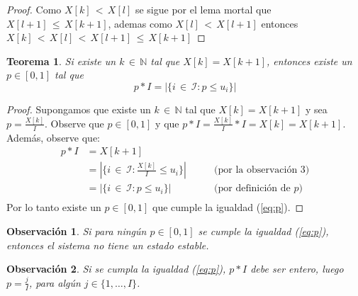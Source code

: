 \documentclass{article}
\newtheorem{teor}{Teorema}
\newtheorem{obs}{Observación}
\begin{document}
\begin{proof}
Como $X[k]\,{<}\,X[l]$ se sigue por el lema mortal que $X[l{+}1]\,{\leq}\,X[k{+}1]$, ademas como $X[l]\,{<}\,X[l{+}1]$ entonces $X[k]\,{<}\,X[l]\,{<}\,X[l{+}1]\,{\leq}\,X[k{+}1]$
\end{proof}

\begin{teor}
Si existe un $k\,{\in}\,\mathbb{N}$ tal que $X[k]=X[k{+}1]$, entonces existe un $p\in[0,1]$ tal que
\begin{equation}\label{eq:p}
p*I=|\{i\,{\in}\,\mathcal{I}:p\leq u_i\}|
\end{equation}
\end{teor}
\begin{proof}

Supongamos que existe un $k\,{\in}\,\mathbb{N}$ tal que $X[k]=X[k{+}1]$ y sea $p=\frac{X[k]}{I}$. Observe que $p\in[0,1]$ y que $p*I=\frac{X[k]}{I}*I=X[k]=X[k{+}1]$. Además, observe que:
\begin{align*}
p*I&=X[k{+}1]\\
&=|\{i\,{\in}\,\mathcal{I}:\frac{X[k]}{I}\leq u_i\}| &\qquad\mbox{(por la observación 3)}\\
&=|\{i\,{\in}\,\mathcal{I}:p\leq u_i\}| &\qquad\mbox{(por definición de $p$)}\\
\end{align*}
Por lo tanto existe un $p\in[0,1]$ que cumple la igualdad (\ref{eq:p}).
\end{proof}

\begin{obs}
Si para ningún $p\in[0,1]$ se cumple la igualdad (\ref{eq:p}), entonces el sistema no tiene un estado estable.
\end{obs}

\begin{obs}
Si se cumpla la igualdad (\ref{eq:p}), $p*I$ debe ser entero, luego $p=\frac{j}{I}$, para algún $j\in\{1,\ldots,I\}$.
\end{obs}
\end{document}

